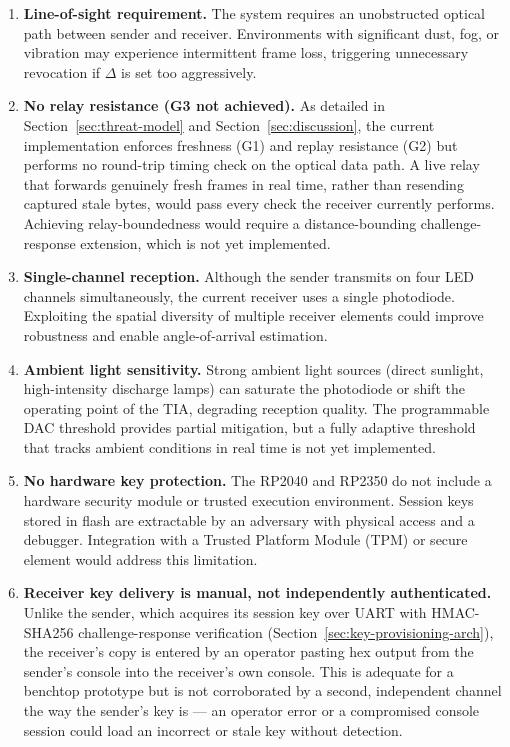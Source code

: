 \documentclass[conference]{IEEEtran}
\begin{document}
\begin{enumerate}
\item \textbf{Line-of-sight requirement.} The system requires an unobstructed optical path between sender and receiver. Environments with significant dust, fog, or vibration may experience intermittent frame loss, triggering unnecessary revocation if $\Delta$ is set too aggressively.

\item \textbf{No relay resistance (G3 not achieved).} As detailed in Section~\ref{sec:threat-model} and Section~\ref{sec:discussion}, the current implementation enforces freshness (G1) and replay resistance (G2) but performs no round-trip timing check on the optical data path. A live relay that forwards genuinely fresh frames in real time, rather than resending captured stale bytes, would pass every check the receiver currently performs. Achieving relay-boundedness would require a distance-bounding challenge-response extension, which is not yet implemented.

\item \textbf{Single-channel reception.} Although the sender transmits on four LED channels simultaneously, the current receiver uses a single photodiode. Exploiting the spatial diversity of multiple receiver elements could improve robustness and enable angle-of-arrival estimation.

\item \textbf{Ambient light sensitivity.} Strong ambient light sources (direct sunlight, high-intensity discharge lamps) can saturate the photodiode or shift the operating point of the TIA, degrading reception quality. The programmable DAC threshold provides partial mitigation, but a fully adaptive threshold that tracks ambient conditions in real time is not yet implemented.

\item \textbf{No hardware key protection.} The RP2040 and RP2350 do not include a hardware security module or trusted execution environment. Session keys stored in flash are extractable by an adversary with physical access and a debugger. Integration with a Trusted Platform Module (TPM) or secure element would address this limitation.

\item \textbf{Receiver key delivery is manual, not independently authenticated.} Unlike the sender, which acquires its session key over UART with HMAC-SHA256 challenge-response verification (Section~\ref{sec:key-provisioning-arch}), the receiver's copy is entered by an operator pasting hex output from the sender's console into the receiver's own console. This is adequate for a benchtop prototype but is not corroborated by a second, independent channel the way the sender's key is — an operator error or a compromised console session could load an incorrect or stale key without detection.

\end{enumerate}
\end{document}
